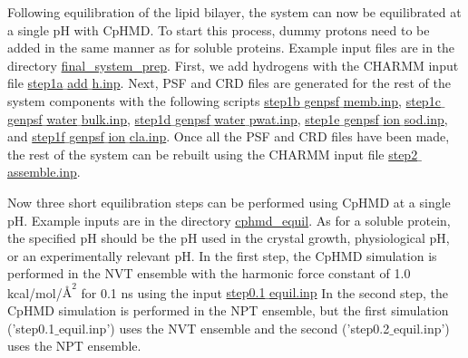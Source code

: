 Following equilibration of the lipid bilayer,
the system can now be equilibrated at a single pH with CpHMD. 
To start this process, dummy protons need to be added in the same manner as for soluble proteins. 
Example input files are in the directory \href{https://gitlab.com/shenlab-amber-cphmd/cphmd-tutorial/-/tree/main/memb_hphmd_charmm/final_system_prep}{final\_system\_prep}. 
First, we add hydrogens 
with the CHARMM input file 
\href{https://gitlab.com/shenlab-amber-cphmd/cphmd-tutorial/-/tree/main/memb_hphmd_charmm/final_system_prep}{step1a$\_$add$\_$h.inp}.
Next, PSF and CRD files are generated for the rest of the system components with the following scripts
\href{https://gitlab.com/shenlab-amber-cphmd/cphmd-tutorial/-/tree/main/memb_hphmd_charmm/final_system_prep}{step1b$\_$genpsf$\_$memb.inp}, \href{https://gitlab.com/shenlab-amber-cphmd/cphmd-tutorial/-/tree/main/memb_hphmd_charmm/final_system_prep}{step1c$\_$genpsf$\_$water$\_$bulk.inp}, 
\href{https://gitlab.com/shenlab-amber-cphmd/cphmd-tutorial/-/tree/main/memb_hphmd_charmm/final_system_prep}{step1d$\_$genpsf$\_$water$\_$pwat.inp},
\href{https://gitlab.com/shenlab-amber-cphmd/cphmd-tutorial/-/tree/main/memb_hphmd_charmm/final_system_prep}{step1e$\_$genpsf$\_$ion$\_$sod.inp}, and
\href{https://gitlab.com/shenlab-amber-cphmd/cphmd-tutorial/-/tree/main/memb_hphmd_charmm/final_system_prep}{step1f$\_$genpsf$\_$ion$\_$cla.inp}.
Once all the PSF and CRD files have been made,
the rest of the system can be rebuilt using the CHARMM input file 
\href{https://gitlab.com/shenlab-amber-cphmd/cphmd-tutorial/-/tree/main/memb_hphmd_charmm/final_system_prep}{step2$\_$assemble.inp}.

Now three short equilibration steps can be performed using CpHMD at a single pH.
Example inputs are in the directory \href{https://gitlab.com/shenlab-amber-cphmd/cphmd-tutorial/-/tree/main/memb_hphmd_charmm/cphmd_equil}{cphmd\_equil}. 
As for a soluble protein, the specified pH should be the pH used in the crystal growth, physiological pH, or an experimentally relevant pH.
In the first step, the CpHMD simulation is performed 
in the NVT ensemble
with the harmonic force constant of 1.0 kcal/mol/$\mbox{\AA}^2$ for 0.1 ns using the input
\href{https://gitlab.com/shenlab-amber-cphmd/cphmd-tutorial/-/tree/main/memb_hphmd_charmm/cphmd_equil}{step0.1$\_$equil.inp}
In the second step, the CpHMD simulation is performed 
in the NPT ensemble, but the first simulation ('step0.1$\_$equil.inp') uses the NVT ensemble and the second ('step0.2$\_$equil.inp') uses the NPT ensemble.



